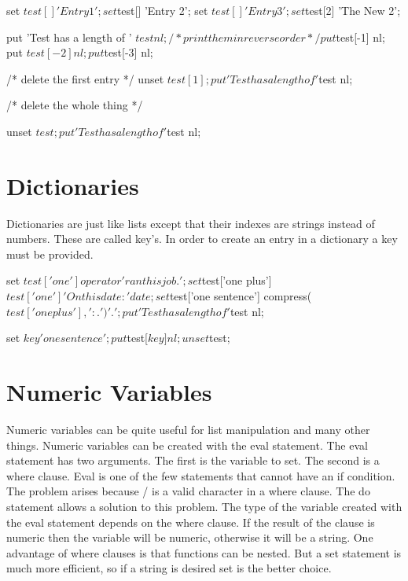 \begin{sfvcode}
           set $test[] 'Entry 1';
           set $test[] 'Entry 2';
           set $test[] 'Entry 3'; 

           set $test[2] 'The New 2';

           put 'Test has a length of ' $test nl;

           /* print them in reverse order */
           put $test[-1] nl;
           put $test[-2] nl;
           put $test[-3] nl;

           /* delete the first entry */
           unset $test[1];
       
           put 'Test has a length of ' $test nl;
 
           /* delete the whole thing */

           unset $test;

           put 'Test has a length of ' $test nl;

\end{sfvcode}

\section{Dictionaries}

Dictionaries are just like lists except that their indexes are strings
instead of numbers.  These are called key's.  In order to create an entry
in a dictionary a key must be provided.

\begin{sfvcode}
            set $test['one']  operator ' ran this job.';           
            set $test['one plus'] $test['one'] ' On this date: ' date;           
            set $test['one sentence'] compress($test['one plus'], ':.') '.';

            put 'Test has a length of ' $test nl;

            set $key 'one sentence';
            put $test[$key] nl;

           unset $test;

\end{sfvcode}

\section{Numeric Variables}
Numeric variables can be quite useful for list manipulation and many other
things.  Numeric variables can be created with the eval statement.  The eval
statement has two arguments.  The first is the variable to set.  The second
is a where clause.  Eval is one of the few statements that cannot have an
if condition.   The problem arises because / is a valid character in a where clause.
The do statement allows a solution to this problem.
The type of the variable created with the eval statement 
depends on the where clause.  If the result of the clause is numeric then
the variable will be numeric, otherwise it will be a string.  One advantage
of where clauses is that functions can be nested.  But a set statement is
much more efficient, so if a string is desired set is the better choice.

